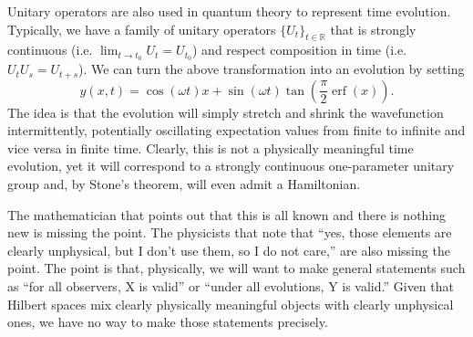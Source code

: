 \documentclass[10pt,twocolumn, nofootinbib]{revtex4-2}
\DeclareMathOperator{\erf}{erf}
\begin{document}
Unitary operators are also used in quantum theory to represent time evolution. Typically, we have a family of unitary operators $\{U_t\}_{t \in \mathbb{R}}$ that is strongly continuous (i.e. $\lim_{t \to t_0} U_t = U_{t_0}$) and respect composition in time (i.e. $U_t U_s = U_{t+s}$). We can turn the above transformation into an evolution by setting
\begin{equation}
y(x, t) = \cos(\omega t) x + \sin(\omega t) \tan \left(\frac{\pi}{2}\erf(x)\right).
\end{equation}
The idea is that the evolution will simply stretch and shrink the wavefunction intermittently, potentially oscillating expectation values from finite to infinite and vice versa in finite time. Clearly, this is not a physically meaningful time evolution, yet it will correspond to a strongly continuous one-parameter unitary group and, by Stone's theorem, will even admit a Hamiltonian.

The mathematician that points out that this is all known and there is nothing new is missing the point. The physicists that note that ``yes, those elements are clearly unphysical, but I don't use them, so I do not care,'' are also missing the point. The point is that, physically, we will want to make general statements such as ``for all observers, X is valid'' or ``under all evolutions, Y is valid.'' Given that Hilbert spaces mix clearly physically meaningful objects with clearly unphysical ones, we have no way to make those statements precisely.
\end{document}
